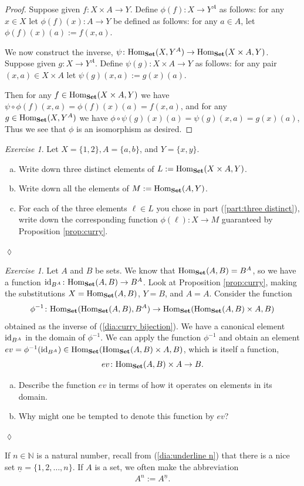 \documentclass{book}
\def\tn{\textnormal}
\def\NN{{\mathbb N}}
\def\Hom{\tn{Hom}}
\def\to{\rightarrow}
\def\taking{\colon}
\def\m1{{-1}}
\def\ul{\underline}
\def\id{\tn{id}}
\def\Set{{\bf Set}}
\theoremstyle{remark}
\newtheorem{exc}[subsubsection]{Exercise}
\newenvironment{exercise}{\begin{exc}}{\hspace*{\fill}$\lozenge$\end{exc}}
\theoremstyle{definition}
\def\sexc{\begin{enumerate}[a.)]\setlength{\itemsep}{.1cm}\setlength{\parskip}{.1cm}\item}
\def\next{\item}
\def\endsexc{\end{enumerate}}
\begin{document}
\begin{proof}

Suppose given $f\taking X\times A\to Y$. Define $\phi(f)\taking X\to Y^A$ as follows: for any $x\in X$ let $\phi(f)(x)\taking A\to Y$ be defined as follows: for any $a\in A$, let $\phi(f)(x)(a):=f(x,a)$. 

We now construct the inverse, $\psi\taking\Hom_\Set(X,Y^A)\to\Hom_\Set(X\times A,Y)$. Suppose given $g\taking X\to Y^A$. Define $\psi(g)\taking X\times A\to Y$ as follows: for any pair $(x,a)\in X\times A$ let $\psi(g)(x,a):=g(x)(a)$. 

Then for any $f\in\Hom_\Set(X\times A,Y)$ we have $\psi\circ\phi(f)(x,a)=\phi(f)(x)(a)=f(x,a)$, and for any $g\in\Hom_\Set(X,Y^A)$ we have $\phi\circ\psi(g)(x)(a)=\psi(g)(x,a)=g(x)(a)$, Thus we see that $\phi$ is an isomorphism as desired.

\end{proof}

\begin{exercise}
Let $X=\{1,2\}, A=\{a,b\}$, and $Y=\{x,y\}$. 
\sexc\label{part:three distinct} Write down three distinct elements of $L:=\Hom_\Set(X\times A,Y)$. 
\next Write down all the elements of $M:=\Hom_\Set(A,Y)$. 
\next For each of the three elements $\ell\in L$ you chose in part (\ref{part:three distinct}), write down the corresponding function $\phi(\ell)\taking X\to M$ guaranteed by Proposition \ref{prop:curry}.
\endsexc
\end{exercise}

\begin{exercise}\label{exc:evaluation}
Let $A$ and $B$ be sets. We know that $\Hom_\Set(A,B)=B^A$, so we have a function $\id_{B^A}\taking\Hom_\Set(A,B)\to B^A$. Look at Proposition \ref{prop:curry}, making the substitutions $X=\Hom_\Set(A,B)$, $Y=B$, and  $A=A$. Consider the function $$\phi^\m1\taking\Hom_\Set(\Hom_\Set(A,B),B^A)\to\Hom_\Set(\Hom_\Set(A,B)\times A,B)$$ obtained as the inverse of (\ref{dia:curry bijection}). We have a canonical element $\id_{B^A}$ in the domain of $\phi^\m1$. We can apply the function $\phi^\m1$ and obtain an element $ev=\phi^\m1(\id_{B^A})\in\Hom_\Set(\Hom_\Set(A,B)\times A,B)$, which is itself a function, $$ev\taking\Hom_\Set(A,B)\times A\to B.$$ 
\sexc Describe the function $ev$ in terms of how it operates on elements in its domain. 
\next Why might one be tempted to denote this function by $ev$?
\endsexc
\end{exercise}

If $n\in\NN$ is a natural number, recall from (\ref{dia:underline n}) that there is a nice set $\ul{n}=\{1,2,\ldots,n\}$. If $A$ is a set, we often make the abbreviation 
\begin{align}\label{dia:exponential abbrev}
A^n:=A^{\ul{n}}.
\end{align}
\end{document}

